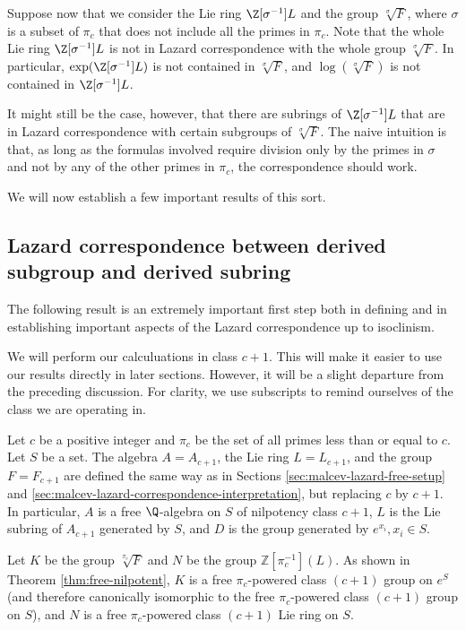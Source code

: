 \documentclass{ucetd}
\begin{document}
Suppose now that we consider the Lie ring $\Z[\sigma^{-1}]L$ and the
group $\sqrt[\sigma]{F}$, where $\sigma$ is a subset of $\pi_c$ that
does not include all the primes in $\pi_c$. Note that the whole Lie
ring $\Z[\sigma^{-1}]L$ is not in Lazard correspondence with the whole
group $\sqrt[\sigma]{F}$. In particular, $\exp(\Z[\sigma^{-1}]L)$ is
not contained in $\sqrt[\sigma]{F}$, and $\log(\sqrt[\sigma]{F})$ is
not contained in $\Z[\sigma^{-1}]L$.

It might still be the case, however, that there are subrings of
$\Z[\sigma^{-1}]L$ that are in Lazard correspondence with certain
subgroups of $\sqrt[\sigma]{F}$. The naive intuition is that, as long
as the formulas involved require division only by the primes in
$\sigma$ and not by any of the other primes in $\pi_c$, the
correspondence should work.

We will now establish a few important results of this sort.

\subsection{Lazard correspondence between derived subgroup and derived subring}\label{sec:lazard-correspondence-derived}

The following result is an extremely important first step both in
defining and in establishing important aspects of the Lazard
correspondence up to isoclinism.

We will perform our calculuations in class $c + 1$. This will make it
easier to use our results directly in later sections. However, it will
be a slight departure from the preceding discussion. For clarity, we
use subscripts to remind ourselves of the class we are operating in.

Let $c$ be a positive integer and $\pi_c$ be the set of all primes
less than or equal to $c$. Let $S$ be a set. The algebra $A =
A_{c+1}$, the Lie ring $L = L_{c+1}$, and the group $F = F_{c+1}$ are
defined the same way as in Sections \ref{sec:malcev-lazard-free-setup}
and \ref{sec:malcev-lazard-correspondence-interpretation}, but
replacing $c$ by $c + 1$. In particular, $A$ is a free
$\Q$-algebra on $S$ of nilpotency class $c + 1$, $L$ is the Lie
subring of $A_{c+1}$ generated by $S$, and $D$ is the group
generated by $e^{x_i}, x_i \in S$.

Let $K$ be the group $\sqrt[\pi_c]{F}$ and $N$ be the group
$\mathbb{Z}[\pi_c^{-1}](L)$. As shown in Theorem
\ref{thm:free-nilpotent}, $K$ is a free $\pi_c$-powered class $(c +
1)$ group on $e^S$ (and therefore canonically isomorphic to the free
$\pi_c$-powered class $(c + 1)$ group on $S$), and $N$ is a free
$\pi_c$-powered class $(c + 1)$ Lie ring on $S$.
\end{document}
